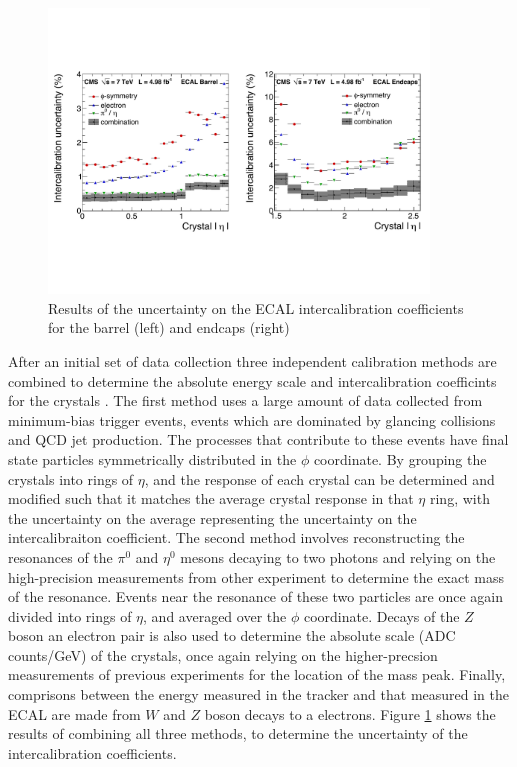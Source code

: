 \begin{figure}[h]
   \centering
  \includegraphics[width=0.9\textwidth]{Figures/Reconstruction_Diagrams/ECAL_intercalibration_combined_methods.pdf}
  \caption{Results of the uncertainty on the ECAL intercalibration
    coefficients for the barrel (left) and endcaps (right)} \label{fig:ecal_intercal}
\end{figure}

\par After an initial set of data collection three independent
calibration methods are combined to determine the absolute energy
scale and intercalibration coefficints for the crystals
\cite{Chatrchyan:155414}.  The first method uses a large amount of
data collected from minimum-bias trigger events, events which are
dominated by glancing collisions and QCD jet production.  The
processes that contribute to these events have final state particles
symmetrically distributed in the $\phi$ coordinate.  By grouping the
crystals into rings of $\eta$, and the response of each crystal can be
determined and modified such that it matches the average crystal
response in that $\eta$ ring, with the uncertainty on the average
representing the uncertainty on the intercalibraiton coefficient.  The
second method involves reconstructing the resonances of the $\pi^{0}$
and $\eta^{0}$ mesons decaying to two photons and relying on the
high-precision measurements from other experiment to determine the
exact mass of the resonance.  Events near the resonance of these two
particles are once again divided into rings of $\eta$, and averaged
over the $\phi$ coordinate.  Decays of the $Z$ boson an electron pair
is also used to determine the absolute scale (ADC counts/GeV) of the
crystals, once again relying on the higher-precsion measurements of
previous experiments for the location of the mass peak.  Finally,
comprisons between the energy measured in the tracker and that
measured in the ECAL are made from $W$ and $Z$ boson decays to a
electrons.  Figure \ref{fig:ecal_intercal} shows the results of
combining all three methods, to determine the uncertainty of the
intercalibration coefficients.  

